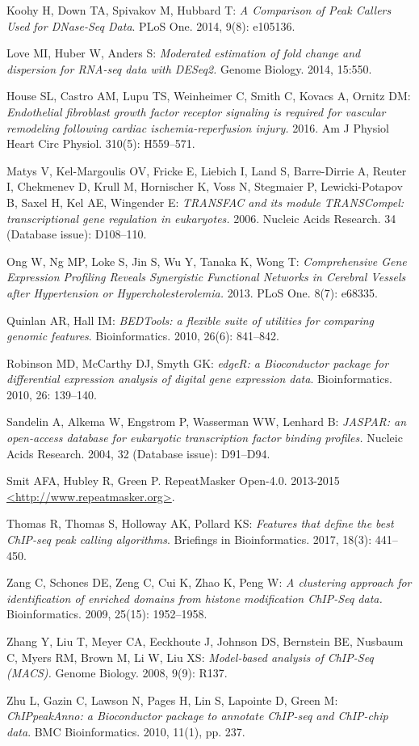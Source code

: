 \documentclass[12pt]{article}
\begin{document}
\begin{thebibliography}{31}
Koohy H, Down TA, Spivakov M, Hubbard T: \textit{A Comparison of Peak Callers Used for DNase-Seq Data}.  PLoS One. 2014, 9(8): e105136. 

Love MI, Huber W, Anders S:  \textit{Moderated estimation of fold change and dispersion for RNA-seq data with DESeq2.}  Genome Biology.  2014, 15:550.

House SL, Castro AM, Lupu TS, Weinheimer C, Smith C, Kovacs A, Ornitz DM: \textit{Endothelial fibroblast growth factor receptor signaling is required for vascular remodeling following cardiac ischemia-reperfusion injury.}  2016.  Am J Physiol Heart Circ Physiol.  310(5): H559--571.

Matys V, Kel-Margoulis OV, Fricke E, Liebich I, Land S, Barre-Dirrie A, Reuter I, Chekmenev D, Krull M, Hornischer K, Voss N, Stegmaier P, Lewicki-Potapov B, Saxel H, Kel AE, Wingender E:  \textit{TRANSFAC and its module TRANSCompel: transcriptional gene regulation in eukaryotes.}  2006.  Nucleic Acids Research.  34 (Database issue): D108--110.

Ong W, Ng MP, Loke S, Jin S, Wu Y, Tanaka K, Wong T: \textit{Comprehensive Gene Expression Profiling Reveals Synergistic Functional Networks in Cerebral Vessels after Hypertension or Hypercholesterolemia.}  2013.  PLoS One.  8(7): e68335.

Quinlan AR, Hall IM: \textit{BEDTools: a flexible suite of utilities for comparing genomic features}. Bioinformatics. 2010, 26(6): 841--842.

Robinson MD, McCarthy DJ, Smyth GK: \textit{edgeR: a Bioconductor package for differential expression analysis of digital gene expression data}. Bioinformatics. 2010, 26: 139--140.

Sandelin A, Alkema W, Engstrom P, Wasserman WW, Lenhard B:  \textit{JASPAR: an open-access database for eukaryotic transcription factor binding profiles.}  Nucleic Acids Research.  2004, 32 (Database issue): D91--D94.  

Smit AFA, Hubley R, Green P. RepeatMasker Open-4.0.  2013-2015  \url{<http://www.repeatmasker.org>}.

Thomas R, Thomas S, Holloway AK, Pollard KS: \textit{Features that define the best ChIP-seq peak calling algorithms}.  Briefings in Bioinformatics.  2017, 18(3): 441--450.

Zang C, Schones DE, Zeng C, Cui K, Zhao K, Peng W:  \textit{A clustering approach for identification of enriched domains from histone modification ChIP-Seq data.}  Bioinformatics.  2009, 25(15): 1952--1958.

Zhang Y, Liu T, Meyer CA, Eeckhoute J, Johnson DS, Bernstein BE, Nusbaum C, Myers RM, Brown M, Li W, Liu XS:  \textit{Model-based analysis of ChIP-Seq (MACS).}  Genome Biology.  2008, 9(9): R137.

Zhu L, Gazin C, Lawson N, Pages H, Lin S, Lapointe D, Green M: \textit{ChIPpeakAnno: a Bioconductor package to annotate ChIP-seq and ChIP-chip data}.  BMC Bioinformatics.  2010, 11(1), pp. 237.

\end{thebibliography}
\end{document}
